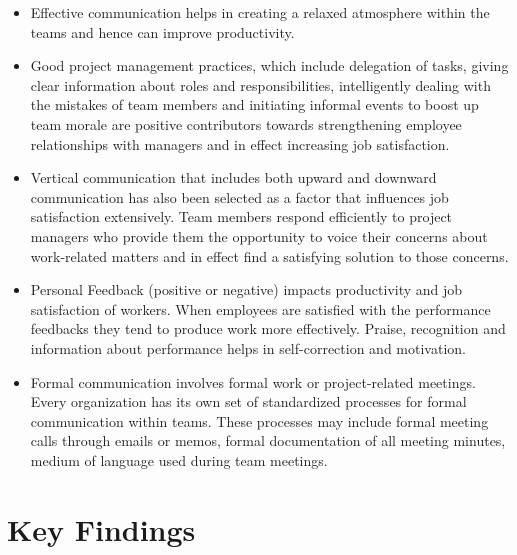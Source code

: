 \documentclass[runningheads]{llncs}
\begin{document}
\begin{itemize}[label=$\bullet$]
    \item Effective communication helps in creating a relaxed atmosphere within the teams and hence can improve productivity.
    \item Good project management practices, which include delegation of tasks, giving clear information about roles and responsibilities, intelligently dealing with the mistakes of team members and initiating informal events to boost up team morale are positive contributors towards strengthening employee relationships with managers and in effect increasing job satisfaction.\cite{comm4}
    \item Vertical communication that includes both upward and downward communication has also been selected as a factor that influences job satisfaction extensively. Team members respond efficiently to project managers who provide them the opportunity to voice their concerns about work-related matters and in effect find a satisfying solution to those concerns.\cite{comm2}
    \item Personal Feedback (positive or negative) impacts productivity and job satisfaction of workers. When employees are satisfied with the performance feedbacks they tend to produce work more effectively. Praise, recognition and information about performance helps in self-correction and motivation.\cite{comm3}
    \item Formal communication involves formal work or project-related meetings. Every organization has its own set of standardized processes for formal communication within teams. These processes may include formal meeting calls through emails or memos, formal documentation of all meeting minutes, medium of language used during team meetings.

\end{itemize}


\section{Key Findings}
\end{document}
